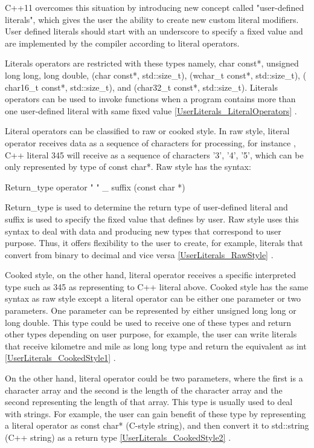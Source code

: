 \documentclass[11pt]{report}
\begin{document}
C++11 overcomes this situation by introducing new concept called "user-defined literals", which gives the user the ability to create new custom literal modifiers. User defined literals should start with an underscore to specify a fixed value and are implemented by the compiler according to literal operators.


Literals operators are restricted with these types namely, char const*, unsigned long long, long double, (char const*, std::size\_t), (wchar\_t const*, std::size\_t), ( char16\_t const*, std::size\_t), and (char32\_t const*, std::size\_t). Literals operators can be used to invoke functions when a program contains more than one user-defined literal with same fixed value \ref{UserLiterals_LiteralOperators} \cite{Gregorie:professionalcpp}.


Literal operators can be classified to raw or cooked style. In raw style, literal operator receives data as a sequence of characters for processing, for instance , C++ literal 345 will receive as a sequence of characters '3', '4', '5', which can be only represented by type of  const char*. Raw style has the syntax:
\begin{center}
Return\_type  operator " " \_ suffix (const char *)
\end{center}

Return\_type is used to determine the return type of user-defined literal and suffix is used to specify the fixed value that defines by user. Raw style uses this syntax to deal with data and producing new types that correspond to user purpose.  Thus, it offers flexibility to the user to create, for example, literals that convert from binary to decimal and vice versa \ref{UserLiterals_RawStyle} \cite{Gregorie:professionalcpp}.


Cooked style, on the other hand, literal operator receives a specific interpreted type such as 345 as representing to C++ literal above. Cooked style has the same syntax as raw style except a literal operator can be either one parameter or two parameters. One parameter can be represented by either unsigned long long or long double. This type could be used to receive one of these types and return other types depending on user purpose, for example, the user can write literals that receive kilometre and mile as long long type and return the equivalent as int \ref{UserLiterals_CookedStyle1} \cite{Gregorie:professionalcpp}.


On the other hand, literal operator could be two parameters, where the first is a character array and the second is the length of the character array and the second representing the length of that array. This type is usually used to deal with strings. For example, the user can gain benefit of these type by representing a literal operator as const char* (C-style string), and then convert it to std::string (C++ string) as a return type \ref{UserLiterals_CookedStyle2} \cite{Gregorie:professionalcpp}.
\end{document}
